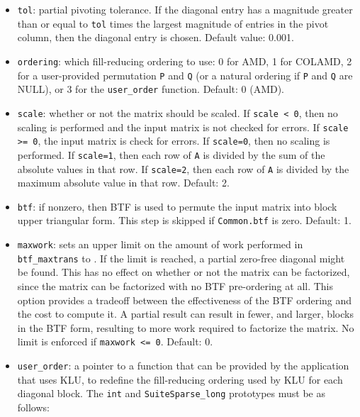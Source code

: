 \documentclass[11pt]{article}
\begin{document}
\begin{itemize}
\item {\tt tol}: partial pivoting tolerance.  If the diagonal entry has a
magnitude greater than or equal to {\tt tol} times the largest magnitude
of entries in the pivot column, then the diagonal entry is chosen.
Default value: 0.001.

\item {\tt ordering}: which fill-reducing ordering to use: 0 for AMD,
1 for COLAMD, 2 for a user-provided permutation {\tt P} and {\tt Q}
(or a natural ordering if {\tt P} and {\tt Q} are NULL), or 3 for
the {\tt user\_order} function.  Default: 0 (AMD).

\item {\tt scale}: whether or not the matrix should be scaled.
If {\tt scale < 0}, then no scaling is performed and the input matrix
is not checked for errors.  If {\tt scale >= 0}, the input matrix is
check for errors.
If {\tt scale=0}, then no scaling is performed.
If {\tt scale=1}, then each row of {\tt A} is divided by the sum of
the absolute values in that row.
If {\tt scale=2}, then each row of {\tt A} is divided by the maximum
absolute value in that row.  Default: 2.

\item {\tt btf}:  if nonzero, then BTF is used to permute the input matrix
into block upper triangular form.  This step is skipped if {\tt Common.btf}
is zero.  Default: 1.

\item {\tt maxwork}: sets an upper limit on the amount of work performed in
{\tt btf\_maxtrans} to .  If the limit is reached,
a partial zero-free diagonal might be found.  This has no effect on whether or
not the matrix can be factorized, since the matrix can be factorized with no
BTF pre-ordering at all.  This option provides a tradeoff between the
effectiveness of the BTF ordering and the cost to compute it.  A partial result
can result in fewer, and larger, blocks in the BTF form, resulting to more work
required to factorize the matrix.  No limit is enforced if {\tt maxwork <= 0}.
Default: 0.

\item {\tt user\_order}: a pointer to a function that can be provided by the
application that uses KLU, to redefine the fill-reducing ordering used by KLU
for each diagonal block.  The {\tt int} and {\tt SuiteSparse\_long} prototypes must be
as follows:


\end{itemize}
\end{document}
